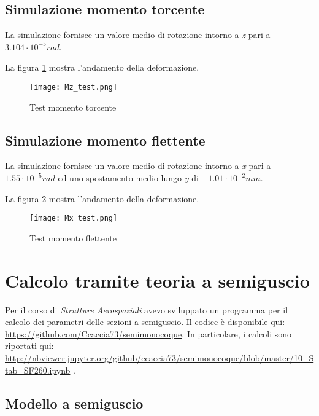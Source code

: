 \documentclass[
10pt, %
a4paper, %
oneside, %
headinclude,footinclude, %
BCOR5mm, %
]{scrartcl}
\begin{document}
\subsection{Simulazione momento torcente}

La simulazione fornisce un valore medio di rotazione intorno a \emph{z} pari a $3.104\cdot 10^{-5} rad$.

La figura \ref{fig:Mztest} mostra l'andamento della deformazione.

\begin{figure}[htb]
	\centering 
	\texttt{[image: Mz\_test.png]} 
	\caption[Test Mz]{Test momento torcente} %
	\label{fig:Mztest} 
\end{figure}



\subsection{Simulazione momento flettente}

La simulazione fornisce un valore medio di rotazione intorno a \emph{x} pari a $1.55\cdot 10^{-5} rad$ ed uno spostamento medio lungo \emph{y} di $-1.01 \cdot 10^{-2}mm$.

La figura \ref{fig:Mxtest} mostra l'andamento della deformazione.

\begin{figure}[htb]
	\centering 
	\texttt{[image: Mx\_test.png]} 
	\caption[Test Mx]{Test momento flettente} %
	\label{fig:Mxtest} 
\end{figure}


\section{Calcolo tramite teoria a semiguscio}

Per il corso di \emph{Strutture Aerospaziali} avevo sviluppato un programma per il calcolo dei parametri delle sezioni a semiguscio. Il codice è disponibile qui: \url{https://github.com/Ccaccia73/semimonocoque}. In particolare, i calcoli sono riportati qui: \url{http://nbviewer.jupyter.org/github/ccaccia73/semimonocoque/blob/master/10_Stab_SF260.ipynb} .

\subsection{Modello a semiguscio}
\end{document}
